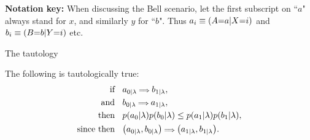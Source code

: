 \textbf{Notation key:} When discussing the Bell scenario, let the first subscript on ``$a$" always stand for $x$, and similarly $y$ for ``$b$". Thus ${a_i \equiv \parens*{A\cramp{=}a|X\cramp{=}i}}$ and ${b_i \equiv \parens*{B\cramp{=}b|Y\cramp{=}i}}$ etc.



\begin{EDITING...}
The tautology
\begin{taut}\label{taut:Hardy}The following is tautologically true:
\begin{align*}
\text{if }&\;\; a_{0|\lambda} {\scriptstyle \implies} b_{1|\lambda},\\
\text{and }&\;\; b_{0|\lambda} {\scriptstyle \implies} a_{1|\lambda},\\
\text{then }&\;\; \p{a_0|\lambda}\p{b_0|\lambda}\leq\p{a_1|\lambda}\p{b_1|\lambda},\\
\text{since then }&\;\; \parens*{a_{0|\lambda} , b_{0|\lambda}} {\scriptstyle \implies} \parens*{a_{1|\lambda} , b_{1|\lambda}}.
\end{align*}
\end{taut}

\end{EDITING...}
